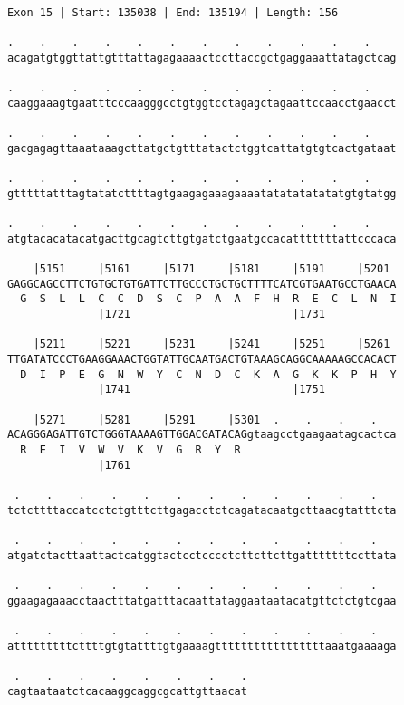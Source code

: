 \documentclass{article}
\begin{document}
\newpage
\begin{Verbatim}
Exon 15 | Start: 135038 | End: 135194 | Length: 156
 
.    .    .    .    .    .    .    .    .    .    .    .    
acagatgtggttattgtttattagagaaaactccttaccgctgaggaaattatagctcag
  
.    .    .    .    .    .    .    .    .    .    .    .    
caaggaaagtgaatttcccaagggcctgtggtcctagagctagaattccaacctgaacct
  
.    .    .    .    .    .    .    .    .    .    .    .    
gacgagagttaaataaagcttatgctgtttatactctggtcattatgtgtcactgataat
  
.    .    .    .    .    .    .    .    .    .    .    .    
gtttttatttagtatatcttttagtgaagagaaagaaaatatatatatatatgtgtatgg
  
.    .    .    .    .    .    .    .    .    .    .    .    
atgtacacatacatgacttgcagtcttgtgatctgaatgccacatttttttattcccaca
  
    |5151     |5161     |5171     |5181     |5191     |5201 
GAGGCAGCCTTCTGTGCTGTGATTCTTGCCCTGCTGCTTTTCATCGTGAATGCCTGAACA
  G  S  L  L  C  C  D  S  C  P  A  A  F  H  R  E  C  L  N  I
              |1721                         |1731           
  
    |5211     |5221     |5231     |5241     |5251     |5261 
TTGATATCCCTGAAGGAAACTGGTATTGCAATGACTGTAAAGCAGGCAAAAAGCCACACT
  D  I  P  E  G  N  W  Y  C  N  D  C  K  A  G  K  K  P  H  Y
              |1741                         |1751           
  
    |5271     |5281     |5291     |5301  .    .    .    .   
ACAGGGAGATTGTCTGGGTAAAAGTTGGACGATACAGgtaagcctgaagaatagcactca
  R  E  I  V  W  V  K  V  G  R  Y  R                        
              |1761                                         
  
 .    .    .    .    .    .    .    .    .    .    .    .   
tctcttttaccatcctctgtttcttgagacctctcagatacaatgcttaacgtatttcta
  
 .    .    .    .    .    .    .    .    .    .    .    .   
atgatctacttaattactcatggtactcctcccctcttcttcttgatttttttccttata
  
 .    .    .    .    .    .    .    .    .    .    .    .   
ggaagagaaacctaactttatgatttacaattataggaataatacatgttctctgtcgaa
  
 .    .    .    .    .    .    .    .    .    .    .    .   
atttttttttcttttgtgtattttgtgaaaagtttttttttttttttttaaatgaaaaga
  
 .    .    .    .    .    .    .    .
cagtaataatctcacaaggcaggcgcattgttaacat
\end{Verbatim}
\end{document}
